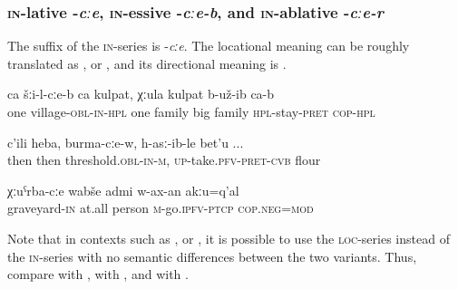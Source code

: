
\subsubsection{\textsc{in}-lative -\textit{cːe}, \textsc{in}-essive -\textit{cːe-b}, and \textsc{in}-ablative -\textit{cːe-r}}
\label{sssec:in-lative -cːe, in-essive -cːe-b, and in-\isi{ablative} -cːe-r}

The suffix of the \textsc{in}-series is -\textit{cːe}. The locational meaning can be roughly translated as  , or  , and its directional meaning is  .
%
\begin{exe} 
	\ex	\label{In one village lived a big family}
	\gll	ca	šːi-l-cːe-b	ca	kulpat,	χːula	kulpat	b-už-ib ca-b \\
		one	village-\textsc{obl-in}-\textsc{hpl} one	family	big	family	\textsc{hpl}-stay-\textsc{pret} \textsc{cop-hpl}\\
	\glt	{}
	
		\ex	\label{Then, on the threshold, he took the flour}
	\gll	c'ili heba, burma-cːe-w, h-asː-ib-le bet'u ...\\
		then then threshold.\textsc{obl-in-m}, \textsc{up}-take.\textsc{pfv-pret-cvb} flour\\
	\glt	{}
	
	\ex	\label{No person at all should go to the graveyard}
	\gll	χːuˁrba-cːe	wabše	admi	w-ax-an	akːu=q'al\\
		graveyard-\textsc{in}	at.all	person	\textsc{m}-go.\textsc{ipfv}-\textsc{ptcp}	\textsc{cop.neg}=\textsc{mod}\\
	\glt	{}
\end{exe}

Note that in contexts such as ,  or , it is possible to use the \textsc{loc}-series instead of the \textsc{in}-series with no semantic differences between the two variants. Thus, compare  with ,  with , and  with . 

